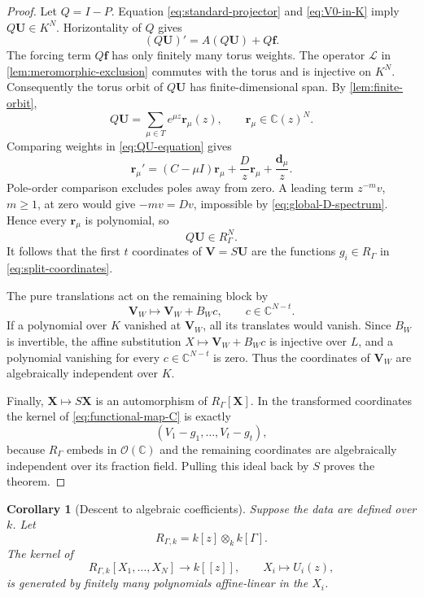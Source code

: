 \documentclass[11pt]{article}
\numberwithin{equation}{section}
\newtheorem{corollary}[corollary]{Corollary}
\theoremstyle{definition}
\theoremstyle{remark}
\newcommand{\C}{\mathbb C}
\begin{document}
\begin{proof}
Let $Q=I-P$.  Equation \eqref{eq:standard-projector} and
\eqref{eq:V0-in-K} imply $Q\mathbf U\in K^N$.  Horizontality of $Q$ gives
\begin{equation}\label{eq:QU-equation}
  (Q\mathbf U)'=A(Q\mathbf U)+Q\mathbf f.
\end{equation}
The forcing term $Q\mathbf f$ has only finitely many torus weights.  The
operator $\mathscr L$ in \cref{lem:meromorphic-exclusion} commutes with the
torus and is injective on $K^N$.  Consequently the torus orbit of
$Q\mathbf U$ has finite-dimensional span.  By
\cref{lem:finite-orbit},
\[
  Q\mathbf U=\sum_{\mu\in T}e^{\mu z}\mathbf r_\mu(z),
  \qquad \mathbf r_\mu\in\C(z)^N.
\]
Comparing weights in \eqref{eq:QU-equation} gives
\begin{equation}\label{eq:rmu-vector}
  \mathbf r_\mu'
  =(C-\mu I)\mathbf r_\mu
   +\frac Dz\mathbf r_\mu
   +\frac{\mathbf d_\mu}{z}.
\end{equation}
Pole-order comparison excludes poles away from zero.  A leading term
$z^{-m}v$, $m\ge1$, at zero would give $-mv=Dv$, impossible by
\eqref{eq:global-D-spectrum}.  Hence every $\mathbf r_\mu$ is polynomial,
so
\begin{equation}\label{eq:QU-in-R}
  Q\mathbf U\in R_\Gamma^N.
\end{equation}
It follows that the first $t$ coordinates of $\mathbf V=S\mathbf U$ are the
functions $g_i\in R_\Gamma$ in \eqref{eq:split-coordinates}.

The pure translations act on the remaining block by
\[
  \mathbf V_W\longmapsto\mathbf V_W+B_Wc,
  \qquad c\in\C^{N-t}.
\]
If a polynomial over $K$ vanished at $\mathbf V_W$, all its translates would
vanish.  Since $B_W$ is invertible, the affine substitution
$X\mapsto\mathbf V_W+B_Wc$ is injective over $L$, and a polynomial vanishing
for every $c\in\C^{N-t}$ is zero.  Thus the coordinates of $\mathbf V_W$
are algebraically independent over $K$.

Finally, $\mathbf X\mapsto S\mathbf X$ is an automorphism of
$R_\Gamma[\mathbf X]$.  In the transformed coordinates the kernel of
\eqref{eq:functional-map-C} is exactly
\[
  (V_1-g_1,\ldots,V_t-g_t),
\]
because $R_\Gamma$ embeds in $\mathscr O(\C)$ and the remaining coordinates
are algebraically independent over its fraction field.  Pulling this ideal
back by $S$ proves the theorem.
\end{proof}

\begin{corollary}[Descent to algebraic coefficients]
\label{cor:algebraic-descent}
Suppose the data are defined over $k$.  Let
\[
  R_{\Gamma,k}=k[z]\otimes_k k[\Gamma].
\]
The kernel of
\[
  R_{\Gamma,k}[X_1,\ldots,X_N]
  \longrightarrow k[[z]],
  \qquad X_i\longmapsto U_i(z),
\]
is generated by finitely many polynomials affine-linear in the $X_i$.
\end{corollary}
\end{document}
